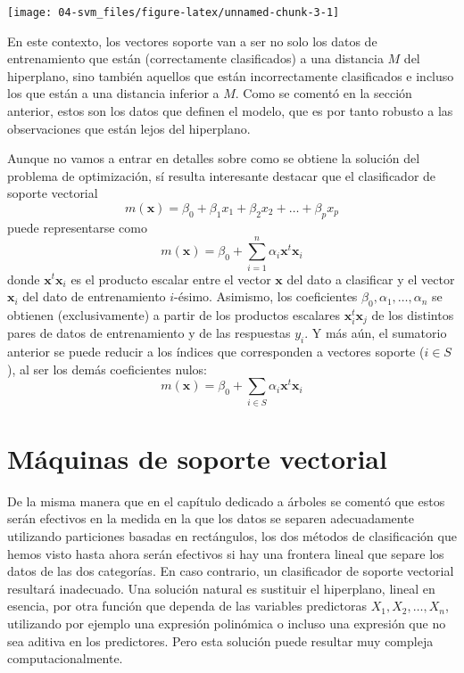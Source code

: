 \documentclass[
]{book}
\theoremstyle{break}
\theoremstyle{definition}
\theoremstyle{definition}
\theoremstyle{definition}
\theoremstyle{remark}
\begin{document}
\begin{center}\texttt{[image: 04-svm\_files/figure-latex/unnamed-chunk-3-1]} \end{center}

En este contexto, los vectores soporte van a ser no solo los datos de entrenamiento que están (correctamente clasificados) a una distancia \(M\) del hiperplano, sino también aquellos que están incorrectamente clasificados e incluso los que están a una distancia inferior a \(M\). Como se comentó en la sección anterior, estos son los datos que definen el modelo, que es por tanto robusto a las observaciones que están lejos del hiperplano.

Aunque no vamos a entrar en detalles sobre como se obtiene la solución del problema de optimización, sí resulta interesante destacar que el clasificador de soporte vectorial
\[m(\mathbf{x}) = \beta_0 + \beta_1 x_1 + \beta_2 x_2 + \ldots + \beta_p x_p\]
puede representarse como
\[m(\mathbf{x}) = \beta_0 + \sum_{i=1}^n \alpha_i \mathbf{x}^t \mathbf{x}_i\]
donde \(\mathbf{x}^t \mathbf{x}_i\) es el producto escalar entre el vector \(\mathbf{x}\) del dato a clasificar y el vector \(\mathbf{x}_i\) del dato de entrenamiento \(i\)-ésimo. Asimismo, los coeficientes \(\beta_0, \alpha_1, \ldots, \alpha_n\) se obtienen (exclusivamente) a partir de los productos escalares \(\mathbf{x}_i^t \mathbf{x}_j\) de los distintos pares de datos de entrenamiento y de las respuestas \(y_i\). Y más aún, el sumatorio anterior se puede reducir a los índices que corresponden a vectores soporte (\(i\in S\)), al ser los demás coeficientes nulos:
\[m(\mathbf{x}) = \beta_0 + \sum_{i\in S} \alpha_i \mathbf{x}^t \mathbf{x}_i\]

\hypertarget{muxe1quinas-de-soporte-vectorial}{%
\section{Máquinas de soporte vectorial}\label{muxe1quinas-de-soporte-vectorial}}

De la misma manera que en el capítulo dedicado a árboles se comentó que estos serán efectivos en la medida en la que los datos se separen adecuadamente utilizando particiones basadas en rectángulos, los dos métodos de clasificación que hemos visto hasta ahora serán efectivos si hay una frontera lineal que separe los datos de las dos categorías. En caso contrario, un clasificador de soporte vectorial resultará inadecuado. Una solución natural es sustituir el hiperplano, lineal en esencia, por otra función que dependa de las variables predictoras \(X_1,X_2, \ldots, X_n\), utilizando por ejemplo una expresión polinómica o incluso una expresión que no sea aditiva en los predictores. Pero esta solución puede resultar muy compleja computacionalmente.
\end{document}
